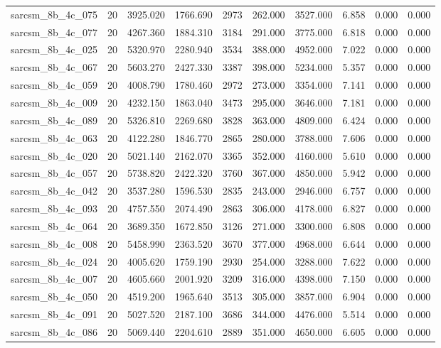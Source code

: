 \begin{tabular}{lrrrrrrrrr}
sarcsm\_8b\_4c\_075 & 20 & 3925.020 & 1766.690 & 2973 & 262.000 & 3527.000 & 6.858 & 0.000 & 0.000 \\
sarcsm\_8b\_4c\_077 & 20 & 4267.360 & 1884.310 & 3184 & 291.000 & 3775.000 & 6.818 & 0.000 & 0.000 \\
sarcsm\_8b\_4c\_025 & 20 & 5320.970 & 2280.940 & 3534 & 388.000 & 4952.000 & 7.022 & 0.000 & 0.000 \\
sarcsm\_8b\_4c\_067 & 20 & 5603.270 & 2427.330 & 3387 & 398.000 & 5234.000 & 5.357 & 0.000 & 0.000 \\
sarcsm\_8b\_4c\_059 & 20 & 4008.790 & 1780.460 & 2972 & 273.000 & 3354.000 & 7.141 & 0.000 & 0.000 \\
sarcsm\_8b\_4c\_009 & 20 & 4232.150 & 1863.040 & 3473 & 295.000 & 3646.000 & 7.181 & 0.000 & 0.000 \\
sarcsm\_8b\_4c\_089 & 20 & 5326.810 & 2269.680 & 3828 & 363.000 & 4809.000 & 6.424 & 0.000 & 0.000 \\
sarcsm\_8b\_4c\_063 & 20 & 4122.280 & 1846.770 & 2865 & 280.000 & 3788.000 & 7.606 & 0.000 & 0.000 \\
sarcsm\_8b\_4c\_020 & 20 & 5021.140 & 2162.070 & 3365 & 352.000 & 4160.000 & 5.610 & 0.000 & 0.000 \\
sarcsm\_8b\_4c\_057 & 20 & 5738.820 & 2422.320 & 3760 & 367.000 & 4850.000 & 5.942 & 0.000 & 0.000 \\
sarcsm\_8b\_4c\_042 & 20 & 3537.280 & 1596.530 & 2835 & 243.000 & 2946.000 & 6.757 & 0.000 & 0.000 \\
sarcsm\_8b\_4c\_093 & 20 & 4757.550 & 2074.490 & 2863 & 306.000 & 4178.000 & 6.827 & 0.000 & 0.000 \\
sarcsm\_8b\_4c\_064 & 20 & 3689.350 & 1672.850 & 3126 & 271.000 & 3300.000 & 6.808 & 0.000 & 0.000 \\
sarcsm\_8b\_4c\_008 & 20 & 5458.990 & 2363.520 & 3670 & 377.000 & 4968.000 & 6.644 & 0.000 & 0.000 \\
sarcsm\_8b\_4c\_024 & 20 & 4005.620 & 1759.190 & 2930 & 254.000 & 3288.000 & 7.622 & 0.000 & 0.000 \\
sarcsm\_8b\_4c\_007 & 20 & 4605.660 & 2001.920 & 3209 & 316.000 & 4398.000 & 7.150 & 0.000 & 0.000 \\
sarcsm\_8b\_4c\_050 & 20 & 4519.200 & 1965.640 & 3513 & 305.000 & 3857.000 & 6.904 & 0.000 & 0.000 \\
sarcsm\_8b\_4c\_091 & 20 & 5027.520 & 2187.100 & 3686 & 344.000 & 4476.000 & 5.514 & 0.000 & 0.000 \\
sarcsm\_8b\_4c\_086 & 20 & 5069.440 & 2204.610 & 2889 & 351.000 & 4650.000 & 6.605 & 0.000 & 0.000 \\

\end{tabular}
